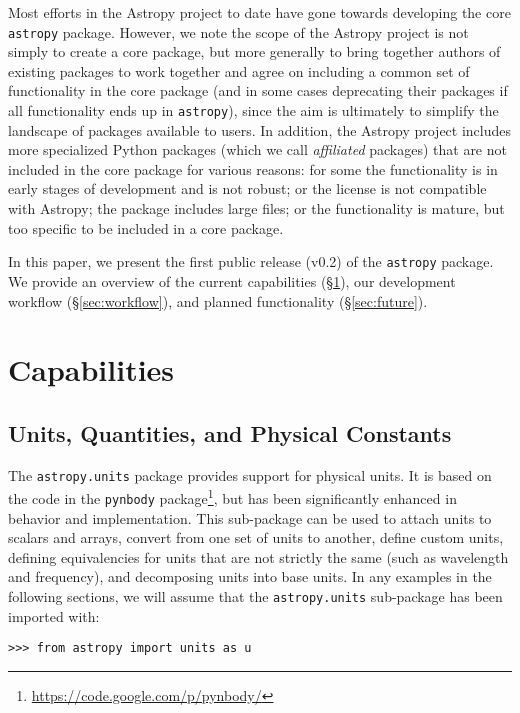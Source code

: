 \documentclass[traditabstract]{aa}
\newcommand{\astropy}{\texttt{astropy}\xspace}
\begin{document}
Most efforts in the Astropy project to date have gone towards developing the
core \astropy package. However, we note the scope of the Astropy project is
not simply to create a core package, but more generally to bring together
authors of existing packages to work together and agree on including a common
set of functionality in the core package (and in some cases deprecating their
packages if all functionality ends up in \astropy), since the aim is
ultimately to simplify the landscape of packages available to users. In
addition, the Astropy project includes more specialized Python packages (which
we call \textit{affiliated} packages) that are not included in the core
package for various reasons: for some the functionality is in early stages of
development and is not robust; or the license is not compatible with Astropy;
the package includes large files; or the functionality is mature, but too
specific to be included in a core package.

In this paper, we present the first public release (v0.2) of the \astropy
package. We provide an overview of the current capabilities
(\S\ref{sec:capabilities}), our development workflow (\S\ref{sec:workflow}),
and planned functionality (\S\ref{sec:future}).


\section{Capabilities}

\label{sec:capabilities}

\subsection{Units, Quantities, and Physical Constants}


The \texttt{astropy.units} package provides support for physical units. It is
based on the code in the \texttt{pynbody} package\footnote{\url{https://code.google.com/p/pynbody/}}, but has been significantly enhanced in behavior and implementation.
This sub-package can be used to attach units to scalars and arrays, convert
from one set of units to another, define custom units, defining equivalencies
for units that are not strictly the same (such as wavelength and frequency),
and decomposing units into base units. In any examples in the following
sections, we will assume that the \texttt{astropy.units} sub-package has been
imported with:
\begin{verbatim}
>>> from astropy import units as u
\end{verbatim}
\end{document}
